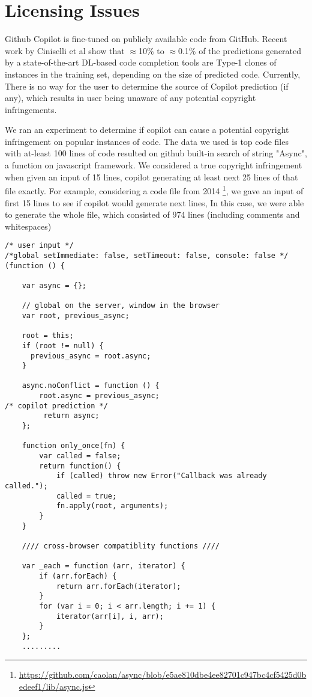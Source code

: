 \section{Licensing Issues}
Github Copilot\cite{copilot} is fine-tuned on publicly available code from GitHub. Recent work by Ciniselli et al\cite{code_clone} show that $\approx$10\% to $\approx$0.1\% of the predictions generated by a state-of-the-art DL-based code completion tools are Type-1 clones of instances in the training set, depending on the size of predicted code. Currently, There is no way for the user to determine the source of Copilot prediction (if any), which results in user being unaware of any potential copyright infringements.

We ran an experiment to determine if copilot can cause a potential copyright infringement on popular instances of code. The data we used is top code files with at-least 100 lines of code resulted on github built-in search of string "Async", a function on javascript framework. We considered a true copyright infringement when given an input of 15 lines, copilot generating at least next 25 lines of that file exactly. For example, considering a code file from 2014 \footnote{\url{https://github.com/caolan/async/blob/e5ae810dbe4ee82701c947bc4cf5425d0bedeef1/lib/async.js}}, we gave an input of first 15 lines to see if copilot would generate next lines, In this case, we were able to generate the whole file, which consisted of 974 lines (including comments and whitespaces)
\begin{lstlisting}[caption=Async code file]
/* user input */
/*global setImmediate: false, setTimeout: false, console: false */
(function () {

    var async = {};

    // global on the server, window in the browser
    var root, previous_async;

    root = this;
    if (root != null) {
      previous_async = root.async;
    }

    async.noConflict = function () {
        root.async = previous_async;
/* copilot prediction */
         return async;
    };

    function only_once(fn) {
        var called = false;
        return function() {
            if (called) throw new Error("Callback was already called.");
            called = true;
            fn.apply(root, arguments);
        }
    }

    //// cross-browser compatiblity functions ////

    var _each = function (arr, iterator) {
        if (arr.forEach) {
            return arr.forEach(iterator);
        }
        for (var i = 0; i < arr.length; i += 1) {
            iterator(arr[i], i, arr);
        }
    };
    .........
\end{lstlisting}
